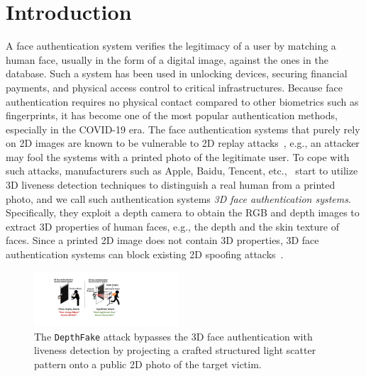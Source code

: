 \section{Introduction}
A face authentication system verifies the legitimacy of a user by matching a human face, usually in the form of a digital image, against the ones in the database. Such a system has been used in unlocking devices, securing financial payments, and physical access control to critical infrastructures. Because face authentication requires no physical contact compared to other biometrics such as fingerprints, it has become one of the most popular authentication methods, especially in the COVID-19 era. The face authentication systems that purely rely on 2D images are known to be vulnerable to 2D replay attacks~\cite{chakka2011competition,anjos2011counter,raghavendra2015presentation}, e.g., an attacker may fool the systems with a printed photo of the legitimate user.
To cope with such attacks, manufacturers such as Apple, Baidu, Tencent, etc.,~\cite{faceid, baidu, tencent} start to utilize 3D liveness detection techniques to distinguish a real human from a printed photo, and we call such authentication systems \textit{3D face authentication systems}. Specifically, they exploit a depth camera to obtain the RGB and depth images to extract 3D properties of human faces, e.g., the depth and the skin texture of faces. Since a printed 2D image does not contain 3D properties, 3D face authentication systems can block existing 2D spoofing attacks~\cite{souza2018far, marcel2014handbook}.




\begin{figure}[t]
	\centerline{\includegraphics[width = 0.48\textwidth]{figures/intro.pdf}}
	\vspace{-0.1in}
	\caption{The \texttt{DepthFake} attack bypasses the 3D face authentication with liveness detection by projecting a crafted structured light scatter pattern onto a public 2D photo of the target victim.}
	\label{intro}
	\vspace{-0.2in}
\end{figure}

